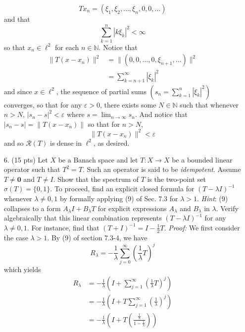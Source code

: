 \documentclass{article}
\begin{document}
\begin{itemize}
    \[Tx_n = (\xi_1, \xi_2, \dots, \xi_n, 0, 0, \dots)\]
    and that 
    \[\sum_{k = 1}^n |k\xi_k|^2 < \infty\]
    so that $x_n \in \ell^2$ for each $n \in \mathbb{N}$. Notice that 
    \begin{align*}
        \|T(x - x_n)\|^2 &= \|(0, 0,\dots, 0, \xi_{n+1},\dots)\|^2\\
        &= \sum_{k = n+1}^{\infty} |\xi_k|^2
    \end{align*}
    and since $x \in \ell^2$, the sequence of partial sums $\left(s_n = \sum_{k = 1}^n |\xi_k|^2\right)$ converges, so that for any $\varepsilon > 0$, there exists some $N \in \mathbb{N}$ such that whenever $n > N$, $|s_n - s|^2 < \varepsilon$ where $s = \lim_{n \to \infty}s_n$. And notice that $|s_n - s| = \|T(x - x_n)\|$ so that for $n > N$, 
    \[\|T(x - x_n)\|^2 < \varepsilon\]
    and so $\mathcal{R}(T)$ is dense in $\ell^2$, as desired.
    \pagebreak
    \item[6.] (15 pts) Let $X$ be a Banach space and let $T: X \to X$ be a bounded linear operator such that $T^2 = T$. Such an operator is said to be \textit{idempotent}. Assume $T \neq \mathbf{0}$ and $T \neq I$. Show that the spectrum of $T$ is the two-point set $\sigma(T) = \{0,1\}$. To proceed, find an explicit closed formula for $(T - \lambda I)^{-1}$ whenever $\lambda \neq 0,1$ by formally applying (9) of Sec. 7.3 for $\lambda > 1$.
    \newline
    \textit{Hint}: (9) collapses to a form $A_{\lambda}I + B_{\lambda}T$ for explicit expressions $A_{\lambda}$ and $B_{\lambda}$ in $\lambda$. Verify algebraically that this linear combination represents $(T - \lambda I)^{-1}$ for any $\lambda \neq 0,1$. For instance, find that $(T + I)^{-1} = I - \tfrac{1}{2}T$.
    \newline\newline
    \textit{Proof:} We first consider the case $\lambda > 1$. By (9) of section 7.3-4, we have 
    \[R_{\lambda} = -\frac{1}{\lambda}\sum_{j = 0}^{\infty} \left(\frac{1}{\lambda}T\right)^j\]
    which yields
    \begin{align*}
        R_{\lambda} &= -\frac{1}{\lambda}\left(I + \sum_{j = 1}^{\infty} \left(\frac{1}{\lambda}T\right)^j\right)\\
        &= -\frac{1}{\lambda}\left(I + T\sum_{j = 1}^{\infty} \left(\frac{1}{\lambda}\right)^j\right) \tag{$T$ idempotent}\\
        &= -\frac{1}{\lambda}\left(I + T\left(\frac{\frac{1}{\lambda}}{1 - \frac{1}{\lambda}}\right)\right)\\

\end{align*}
\end{itemize}
\end{document}
